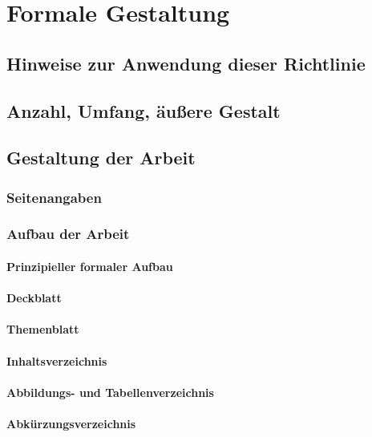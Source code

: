 \chapter{Formale Gestaltung}
\label{formal}
\section{Hinweise zur Anwendung dieser Richtlinie}
\label{formal-hinweise}
\section{Anzahl, Umfang, äußere Gestalt}
\label{formal-anzahl-umfang-gestalt}
\section{Gestaltung der Arbeit}
\label{formal-gestaltung}
\subsection{Seitenangaben}
\label{formal-gestaltung-seitenangaben}
\subsection{Aufbau der Arbeit}
\label{formal-gestaltung-aufbau}
\subsubsection{Prinzipieller formaler Aufbau}
\label{formal-gestaltung-aufbau-prinzipiell}
\subsubsection{Deckblatt}
\label{formal-gestaltung-aufbau-deckblatt}
\subsubsection{Themenblatt}
\label{formal-gestaltung-aufbau-themenblatt}
\subsubsection{Inhaltsverzeichnis}
\label{formal-gestaltung-aufbau-inhaltsverzeichnis}
\subsubsection{Abbildungs- und Tabellenverzeichnis}
\label{formal-gestaltung-aufbau-abbild-tab-verz}
\subsubsection{Abkürzungsverzeichnis}
\label{formal-gestaltung-aufbau-acro-verz}
